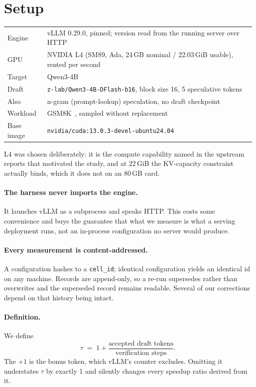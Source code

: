 \documentclass[11pt]{article}
\newcommand{\tw}[1]{\texttt{\small #1}}
\begin{document}
\section{Setup}\label{sec:setup}

\begin{table}[h]\centering\small
\begin{tabular}{ll}
\toprule
Engine & vLLM 0.29.0, pinned; version read from the running server over HTTP\\
GPU & NVIDIA L4 (SM89, Ada, 24\,GB nominal / 22.03\,GiB usable), rented per second\\
Target & Qwen3-4B\\
Draft & \tw{z-lab/Qwen3-4B-DFlash-b16}, block size 16, 5 speculative tokens\\
Also & n-gram (prompt-lookup) speculation, no draft checkpoint\\
Workload & GSM8K~\cite{cobbe2021}, sampled without replacement\\
Base image & \tw{nvidia/cuda:13.0.3-devel-ubuntu24.04}\\
\bottomrule
\end{tabular}
\end{table}

\noindent
L4 was chosen deliberately: it is the compute capability named in the
upstream reports that motivated the study, and at 22\,GiB the KV-capacity
constraint actually binds, which it does not on an 80\,GB card.

\paragraph{The harness never imports the engine.} It launches vLLM as a
subprocess and speaks HTTP. This costs some convenience and buys the
guarantee that what we measure is what a serving deployment runs, not an
in-process configuration no server would produce.

\paragraph{Every measurement is content-addressed.} A configuration hashes
to a \tw{cell\_id}; identical configuration yields an identical id on any
machine. Records are append-only, so a re-run supersedes rather than
overwrites and the superseded record remains readable. Several of our
corrections depend on that history being intact.

\paragraph{Definition.} We define
\[
\tau \;=\; 1 + \frac{\text{accepted draft tokens}}{\text{verification steps}}.
\]
The $+1$ is the bonus token, which vLLM's counter excludes. Omitting it
understates $\tau$ by exactly 1 and silently changes every speedup ratio
derived from it.
\end{document}
